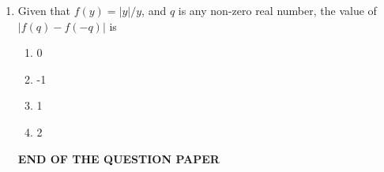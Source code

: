 \documentclass[journal]{IEEEtran}
\numberwithin{equation}{enumi}
\numberwithin{figure}{enumi}
\begin{document}
\begin{enumerate}
\item  Given that $f(y) = |y| / y$, and $q$ is any non-zero real number, the value of  \\$\left| f(q) - f(-q) \right|$ is
\hfill{}
\begin{multicols}{4}
\begin{enumerate}
   \item 0
   \item -1
   \item 1
    \item 2
\end{enumerate}
\end{multicols}

 
\vspace{5cm}
\begin{center}
    \textbf{END OF THE QUESTION PAPER}
\end{center}



\end{enumerate}
\end{document}
